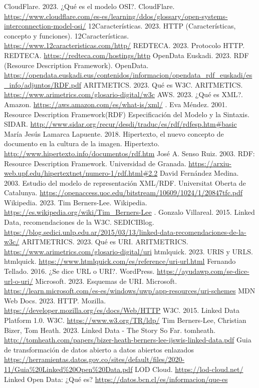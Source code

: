 \documentclass[11pt]{report}
\begin{document}
\begin{thebibliography}{99}
	 CloudFlare. 2023.  ¿Qué es el modelo OSI?.  CloudFlare.  \url{https://www.cloudflare.com/es-es/learning/ddos/glossary/open-systems-interconnection-model-osi/}
	 12Características. 2023. HTTP (Características, concepto y funciones). 12Características. \url{https://www.12caracteristicas.com/http/}
	 REDTECA. 2023. Protocolo HTTP. REDTECA. \url{https://redteca.com/hostings/http}
	OpenData Euskadi. 2023. RDF (Resource Description Framework). OpenData. \url{https://opendata.euskadi.eus/contenidos/informacion/opendata_rdf_euskadi/es_info/adjuntos/RDF.pdf}
	 ARITMETICS. 2023. Qué es W3C. ARITMETICS. \url{https://www.arimetrics.com/glosario-digital/w3c}
	 AWS. 2023. ¿Qué es XML?. Amazon. \url{https://aws.amazon.com/es/what-is/xml/}
	.  Eva Méndez. 2001. Resource Description Framework(RDF)	Especificación del Modelo y la Sintaxis. SIDAR. \url{http://www.sidar.org/recur/desdi/traduc/es/rdf/rdfesp.htm#basic}
	 María Jesús Lamarca Lapuente. 2018. Hipertexto, el nuevo concepto de documento en la cultura de la imagen. Hipertexto. \url{http://www.hipertexto.info/documentos/rdf.htm}
	 José A. Senso Ruiz. 2003. RDF: Resource Description Framework. Universidad de Granada. \url{https://arxiu-web.upf.edu/hipertextnet/numero-1/rdf.html#2.2}
	 David Fernández Medina. 2003. Estudio del modelo de representación XML/RDF. Universitat Oberta de Catalunya. \url{https://openaccess.uoc.edu/bitstream/10609/1024/1/20847tfc.pdf}
	 Wikipedia. 2023. Tim Berners-Lee. Wikipedia. \url{https://es.wikipedia.org/wiki/Tim_Berners-Lee}
	. Gonzalo Villareal. 2015. Linked Data, recomendaciones de la W3C. SEDICIBlog. \url{https://blog.sedici.unlp.edu.ar/2015/03/13/linked-data-recomendaciones-de-la-w3c/}
	 ARITMETRICS. 2023. Qué es URI. ARITMETRICS. \url{https://www.arimetrics.com/glosario-digital/uri}
	 htmlquick. 2023. URIS y URLS. htmlquick. \url{https://www.htmlquick.com/es/reference/uri-url.html}
	 Fernando Tellado. 2016. ¿Se dice URL o URI?. WordPress. \url{https://ayudawp.com/se-dice-url-o-uri/}
	 Microsoft. 2023. Esquemas de URI. Microsoft. \url{https://learn.microsoft.com/es-es/windows/uwp/app-resources/uri-schemes}
	 MDN Web Docs. 2023. HTTP. Mozilla. \url{https://developer.mozilla.org/es/docs/Web/HTTP}
	 W3C. 2015. Linked Data Platform 1.0. W3C. \url{https://www.w3.org/TR/ldp/}
	 Tim Berners-Lee, Christian Bizer, Tom Heath. 2023. Linked Data - The Story So Far. tomheath. \url{http://tomheath.com/papers/bizer-heath-berners-lee-ijswis-linked-data.pdf}
	 Guia de transformación de datos abierto a datos abiertos enlazados \url{https://herramientas.datos.gov.co/sites/default/files/2020-11/Guia%20Linked%20Open%20Data.pdf}
	 LOD Cloud. \url{https://lod-cloud.net/}
	 Linked Open Data: ¿Qué es?	\url{https://datos.bcn.cl/es/informacion/que-es}
\end{thebibliography}
\end{document}
